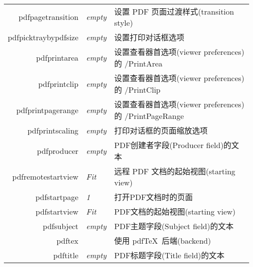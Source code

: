 \documentclass{article}
\begin{document}
\begin{longtable}{@{}>{\ttfamily}rlp{7cm}@{}}
    pdfpagetransition                 & \textit{empty}         & 设置 PDF 页面过渡样式(transition style)                                                                 \\
    pdfpicktraybypdfsize
                                      & \textit{empty}         & 设置打印对话框选项                                                                                       \\
    pdfprintarea                      & \textit{empty}         & 设置查看器首选项(viewer preferences)的 /PrintArea                                                        \\
    pdfprintclip                      & \textit{empty}         & 设置查看器首选项(viewer preferences)的 /PrintClip                                                        \\
    pdfprintpagerange                 & \textit{empty}         & 设置查看器首选项(viewer preferences)的 /PrintPageRange                                                   \\
    pdfprintscaling                   & \textit{empty}         & 打印对话框的页面缩放选项                                                                                    \\
    pdfproducer                       & \textit{empty}         & PDF创建者字段(Producer field)的文本                                                                     \\
    pdfremotestartview                & \textit{Fit}           & 远程 PDF 文档的起始视图(starting view)                                                                   \\
    pdfstartpage                      & \textit{1}             & 打开PDF文档时的页面                                                                                     \\
    pdfstartview                      & \textit{Fit}           & PDF文档的起始视图(starting view)                                                                       \\
    pdfsubject                        & \textit{empty}         & PDF主题字段(Subject field)的文本                                                                       \\
    pdftex                            &                        & 使用 \textsf{pdf\TeX}\ 后端(backend)                                                                \\
    pdftitle                          & \textit{empty}         & PDF标题字段(Title field)的文本                                                                         \\

\end{longtable}
\end{document}
